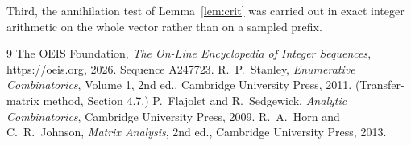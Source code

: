 \documentclass[11pt,a4paper]{article}
\theoremstyle{plain}
\theoremstyle{definition}
\begin{document}
Third, the annihilation test of Lemma~\ref{lem:crit} was carried out in exact integer
arithmetic on the whole vector rather than on a sampled prefix.

\begin{thebibliography}{9}
 The OEIS Foundation, \emph{The On-Line Encyclopedia of Integer
Sequences}, \url{https://oeis.org}, 2026. Sequence A247723.
 R.~P.~Stanley, \emph{Enumerative Combinatorics}, Volume 1, 2nd ed.,
Cambridge University Press, 2011. (Transfer-matrix method, Section 4.7.)
 P.~Flajolet and R.~Sedgewick, \emph{Analytic Combinatorics}, Cambridge
University Press, 2009.
 R.~A.~Horn and C.~R.~Johnson, \emph{Matrix Analysis}, 2nd ed., Cambridge
University Press, 2013.
\end{thebibliography}
\end{document}
